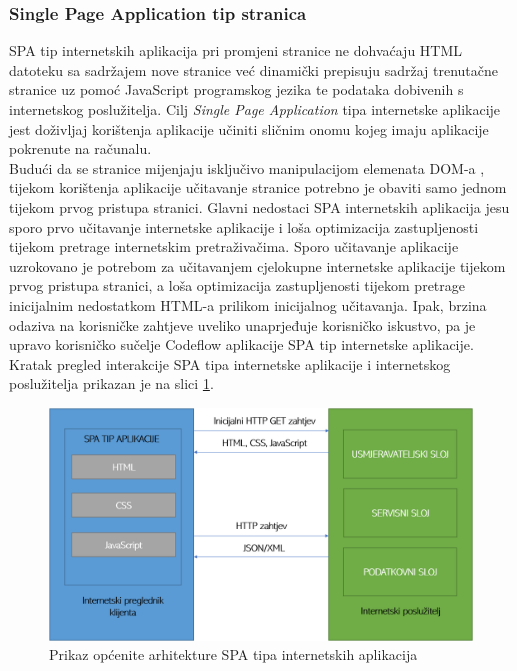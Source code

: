 \documentclass[times, utf8, zavrsni]{fer}
\begin{document}
		\subsubsection{Single Page Application tip stranica}
		SPA  tip internetskih aplikacija pri promjeni stranice ne dohvaćaju HTML datoteku sa sadržajem nove stranice već dinamički prepisuju sadržaj trenutačne stranice uz pomoć JavaScript programskog jezika te podataka dobivenih s internetskog poslužitelja. Cilj \textit{Single Page Application} tipa internetske aplikacije jest doživljaj korištenja aplikacije učiniti sličnim onomu kojeg imaju aplikacije pokrenute na računalu.\\ 
		Budući da se stranice mijenjaju isključivo manipulacijom elemenata DOM-a , tijekom korištenja aplikacije učitavanje stranice potrebno je obaviti samo jednom tijekom prvog pristupa stranici. Glavni nedostaci SPA internetskih aplikacija jesu sporo prvo učitavanje internetske aplikacije i loša optimizacija zastupljenosti tijekom pretrage internetskim pretraživačima. Sporo učitavanje aplikacije uzrokovano je potrebom za učitavanjem cjelokupne internetske aplikacije tijekom prvog pristupa stranici, a loša optimizacija zastupljenosti tijekom pretrage inicijalnim nedostatkom HTML-a prilikom inicijalnog učitavanja. Ipak, brzina odaziva na korisničke zahtjeve uveliko unaprjeđuje korisničko iskustvo, pa je upravo korisničko sučelje Codeflow aplikacije SPA tip internetske aplikacije. Kratak pregled interakcije SPA tipa internetske aplikacije i internetskog poslužitelja prikazan je na slici \ref{fig:spa}.
		\begin{figure}[H]
			\centering
			\includegraphics[width=\linewidth]{pictures/prikazi/SPA.png}
			\caption{Prikaz općenite arhitekture SPA tipa internetskih aplikacija}
			\label{fig:spa}
		\end{figure}
				
\end{document}
